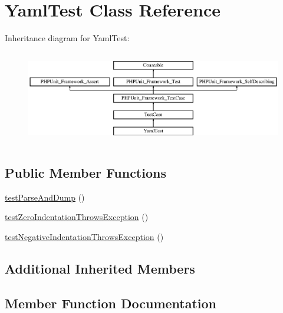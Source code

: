 \hypertarget{class_symfony_1_1_component_1_1_yaml_1_1_tests_1_1_yaml_test}{}\section{Yaml\+Test Class Reference}
\label{class_symfony_1_1_component_1_1_yaml_1_1_tests_1_1_yaml_test}
Inheritance diagram for Yaml\+Test\+:\begin{figure}[H]
\begin{center}
\leavevmode
\includegraphics[height=4.129793cm]{class_symfony_1_1_component_1_1_yaml_1_1_tests_1_1_yaml_test}
\end{center}
\end{figure}
\subsection*{Public Member Functions}
\begin{DoxyCompactItemize}
\item 
\mbox{\hyperlink{class_symfony_1_1_component_1_1_yaml_1_1_tests_1_1_yaml_test_aa4b0f9bbd68ce5dfd5762103d00c7e23}{test\+Parse\+And\+Dump}} ()
\item 
\mbox{\hyperlink{class_symfony_1_1_component_1_1_yaml_1_1_tests_1_1_yaml_test_abd2a07951f38494a1fe3e2374ffd04de}{test\+Zero\+Indentation\+Throws\+Exception}} ()
\item 
\mbox{\hyperlink{class_symfony_1_1_component_1_1_yaml_1_1_tests_1_1_yaml_test_a463ecf8da1932cf4ca8e02b4d0bf8a66}{test\+Negative\+Indentation\+Throws\+Exception}} ()
\end{DoxyCompactItemize}
\subsection*{Additional Inherited Members}


\subsection{Member Function Documentation}
\mbox{\label{class_symfony_1_1_component_1_1_yaml_1_1_tests_1_1_yaml_test_a463ecf8da1932cf4ca8e02b4d0bf8a66}} 
